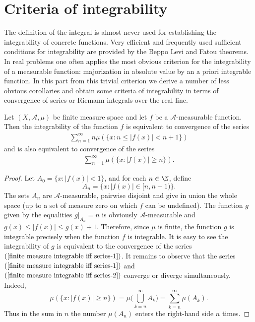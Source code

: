 \section{Criteria of integrability}
The definition of the integral is almost never used for establishing the integrability of concrete functions. Very efficient and frequently used sufficient conditions for integrability are provided by the Beppo Levi and Fatou theorems. In real problems one often applies the most obvious criterion for the integrability of a measurable function: majorization in absolute value by an a priori integrable function. In this part from this trivial criterion we derive a number of less obvious corollaries and obtain some criteria of integrability in terms of convergence of series or Riemann integrals over the real line.
\begin{theorem}\label{finite measure integrable iff}
Let $(X,\mathcal{A},\mu)$ be finite measure space and let $f$ be a $\mathcal{A}$-measurable function. Then the integrability of the function $f$ is equivalent to convergence of the series
\begin{align}\label{finite measure integrable iff series-1}
\sum_{n=1}^{\infty}n\mu(\{x:n\leq |f(x)|<n+1\})
\end{align}
and is also equivalent to convergence of the series
\begin{align}\label{finite measure integrable iff series-2}
\sum_{n=1}^{\infty}\mu(\{x:|f(x)|\geq n\}).
\end{align}
\end{theorem}
\begin{proof}
Let $A_0=\{x:|f(x)|<1\}$, and for each $n\in\N$, define
\[A_n=\{x:|f(x)|\in[n,n+1)\}.\]
The sets $A_n$ are $\mathcal{A}$-measurable, pairwise disjoint and give in union the whole space (up to a set of measure zero on which $f$ can be undefined). The function $g$ given by the equalities $g|_{A_n}=n$ is obviously $\mathcal{A}$-measurable and $g(x)\leq |f(x)|\leq g(x)+1$. Therefore, since $\mu$ is finite, the function $g$ is integrable precisely when the function $f$ is integrable. It is easy to see the integrability of $g$ is equivalent to the convergence of the series $(\ref{finite measure integrable iff series-1})$. It remains to observe that the series $(\ref{finite measure integrable iff series-1})$ and $(\ref{finite measure integrable iff series-2})$ converge or diverge simultaneously. Indeed,
\[\mu(\{x:|f(x)|\geq n\})=\mu\Big(\bigcup_{k=n}^{\infty}A_k\Big)=\sum_{k=n}^{\infty}\mu(A_k).\]
Thus in the sum in $n$ the number $\mu(A_n)$ enters the right-hand side $n$ times.
\end{proof}
